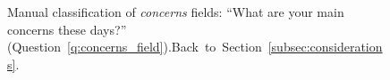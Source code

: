 \begin{figure}[h!]
    \caption[Manual classification of \textit{concerns} fields]{Manual classification of \textit{concerns} fields: ``What are your main concerns these days?'' (Question~\ref{q:concerns_field}).\hfill Back~to~Section~\ref{subsec:considerations}.
    }\label{fig:concerns_field}
\end{figure}

